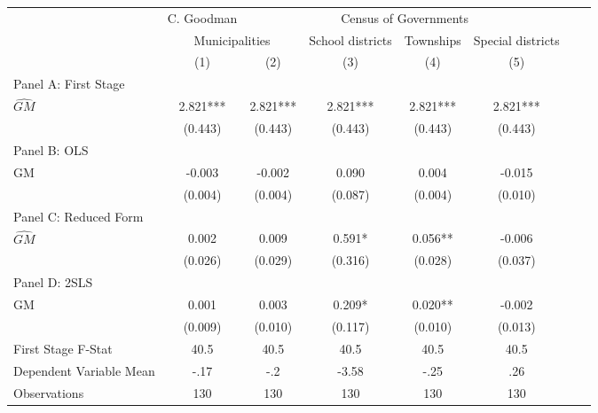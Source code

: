  \begin{tabular}{l*{7}{c}} \toprule
&\multicolumn{1}{c}{C. Goodman}&\multicolumn{4}{c}{Census of Governments}\\\cmidrule(lr){2-2}\cmidrule(lr){3-6}
&\multicolumn{2}{c}{Municipalities}&\multicolumn{1}{c}{School districts}&\multicolumn{1}{c}{Townships}&\multicolumn{1}{c}{Special districts}\\\cmidrule(lr){2-3}\cmidrule(lr){4-6}
&\multicolumn{1}{c}{(1)}&\multicolumn{1}{c}{(2)}&\multicolumn{1}{c}{(3)}&\multicolumn{1}{c}{(4)}&\multicolumn{1}{c}{(5)}\\
\cmidrule(lr){1-6}
\multicolumn{5}{l}{Panel A: First Stage}\\
\cmidrule(lr){1-6}
$\widehat{GM}$  &    2.821***&    2.821***&    2.821***&    2.821***&    2.821***\\
                &  (0.443)   &  (0.443)   &  (0.443)   &  (0.443)   &  (0.443)   \\
\cmidrule(lr){1-6}
\multicolumn{5}{l}{Panel B: OLS}\\
\cmidrule(lr){1-6}
GM              &   -0.003   &   -0.002   &    0.090   &    0.004   &   -0.015   \\
                &  (0.004)   &  (0.004)   &  (0.087)   &  (0.004)   &  (0.010)   \\
\cmidrule(lr){1-6}
\multicolumn{5}{l}{Panel C: Reduced Form}\\
\cmidrule(lr){1-6}
$\widehat{GM}$  &    0.002   &    0.009   &    0.591*  &    0.056** &   -0.006   \\
                &  (0.026)   &  (0.029)   &  (0.316)   &  (0.028)   &  (0.037)   \\
\cmidrule(lr){1-6}
\multicolumn{5}{l}{Panel D: 2SLS}\\
\cmidrule(lr){1-6}
GM              &    0.001   &    0.003   &    0.209*  &    0.020** &   -0.002   \\
                &  (0.009)   &  (0.010)   &  (0.117)   &  (0.010)   &  (0.013)   \\
\midrule
First Stage F-Stat&     40.5   &     40.5   &     40.5   &     40.5   &     40.5   \\
Dependent Variable Mean&     -.17   &      -.2   &    -3.58   &     -.25   &      .26   \\
Observations    &      130   &      130   &      130   &      130   &      130   \\
 \bottomrule \end{tabular}
